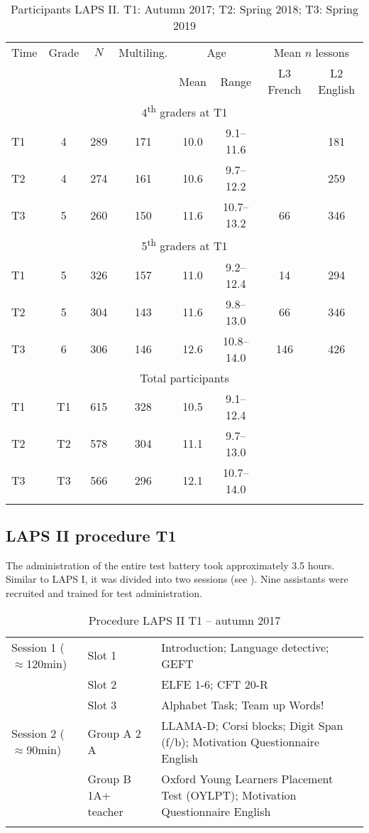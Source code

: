\documentclass[output=paper]{langsci/langscibook}
\begin{document}
\begin{table}
\begin{tabular}{lccccccc} 
\lsptoprule
Time &	Grade &	$N$ & Multiling. & \multicolumn{2}{c}{Age} & \multicolumn{2}{c}{Mean $n$ lessons}\\\cmidrule(lr){5-6}\cmidrule(lr){7-8}
     &        &     &              &  Mean & Range & L3 French & L2 English\\\midrule
\multicolumn{8}{c}{4\textsuperscript{th} graders at T1}\\\midrule
T1 & 4 & 289 & 171 & 10.0 & 9.1--11.6  &    & 181\\
T2 & 4 & 274 & 161 & 10.6 & 9.7--12.2  &    & 259\\
T3 & 5 & 260 & 150 & 11.6 & 10.7--13.2 & 66 & 346\\\midrule
\multicolumn{8}{c}{5\textsuperscript{th} graders at T1}\\\midrule
T1 & 5 & 326 & 157 & 11.0 & 9.2--12.4 & 14 & 294\\
T2 & 5 & 304 & 143 & 11.6 & 9.8--13.0 & 66 & 346\\
T3 & 6 & 306 & 146 & 12.6 & 10.8--14.0 & 146 & 426\\\midrule
\multicolumn{8}{c}{Total participants}\\\midrule
T1 & T1 & 615 & 328 & 10.5 & 9.1--12.4 &   & \\
T2 & T2 & 578 & 304 & 11.1 & 9.7--13.0 &   & \\
T3 & T3 & 566 & 296 & 12.1 & 10.7--14.0&   & \\
\lspbottomrule
\end{tabular}
\caption{Participants LAPS II\label{tab:02:5}. T1: Autumn 2017; T2: Spring 2018; T3: Spring 2019}
\end{table}

 \subsection{LAPS II procedure T1}

The administration of the entire test battery took approximately 3.5 hours. Similar to LAPS I, it was divided into two sessions (see ). Nine assistants were recruited and trained for test administration.

\begin{table}
\begin{tabularx}{\textwidth}{llQ}
\lsptoprule
Session 1 (${\approx}$120min) & Slot 1 & Introduction; Language detective; GEFT\\
& Slot 2 & ELFE 1-6; CFT 20-R\\
& Slot 3 & Alphabet Task; Team up Words!\\
Session 2 (${\approx}$90min) & Group A 2 A & LLAMA-D; Corsi blocks; Digit Span (f/b); Motivation Questionnaire English\\
& Group B 1A+ teacher & Oxford Young Learners Placement Test (OYLPT); Motivation Questionnaire English\\
\lspbottomrule
\end{tabularx}
\caption{Procedure LAPS II T1 – autumn 2017\label{tab:02:6}}
\end{table}
\end{document}
